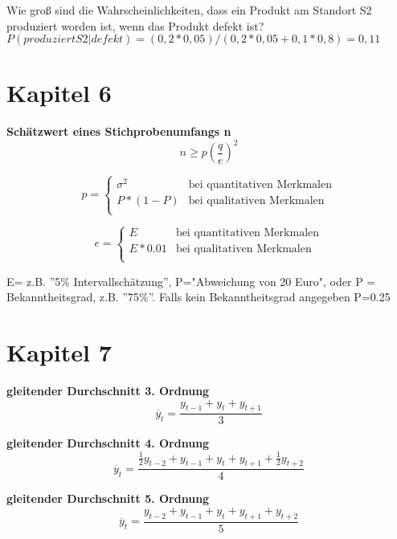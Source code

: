 \documentclass[11pt,twocolumn,fleqn]{article}
\begin{document}
Wie groß sind die Wahrscheinlichkeiten, dass ein Produkt am Standort S2 produziert worden ist, wenn das Produkt defekt ist?
$P(produziert S2 | defekt) = (0,2 * 0,05) / (0,2*0,05 + 0,1 * 0,8) = 0,11$ 


\section{Kapitel 6}

\textbf{Schätzwert eines Stichprobenumfangs n}
\begin{equation*}
n \geq p (\frac{q}{e})^2
\end{equation*}

\begin{equation*}
p = \begin{cases} 
\sigma^2 & \text{bei quantitativen Merkmalen} \\ 
P*(1-P) & \text{bei qualitativen Merkmalen}  \\ 
\end{cases}
\end{equation*}

\begin{equation*}
e = \begin{cases} 
E & \text{bei quantitativen Merkmalen} \\ 
E*0.01 & \text{bei qualitativen Merkmalen}  \\ 
\end{cases}
\end{equation*}

E= z.B. ''5\% Intervallschätzung'', P="Abweichung von 20 Euro", oder P = Bekanntheitsgrad, z.B. ''75\%''. Falls kein Bekanntheitsgrad angegeben P=0.25  

\section{Kapitel 7}
\textbf{gleitender Durchschnitt 3. Ordnung}
\begin{equation*}
\overline{y}_t = \frac{y_{t-1} + y_t + y_{t+1}}{3}
\end{equation*}

\textbf{gleitender Durchschnitt 4. Ordnung}
\begin{equation*}
\overline{y}_t = \frac{ \frac{1}{2}y_{t-2} + y_{t-1} + y_t + y_{t+1} + \frac{1}{2}y_{t+2}}{4}
\end{equation*}

\textbf{gleitender Durchschnitt 5. Ordnung}
\begin{equation*}
\overline{y}_t = \frac{ y_{t-2} + y_{t-1} + y_t + y_{t+1} + y_{t+2}}{5}
\end{equation*}
\end{document}
